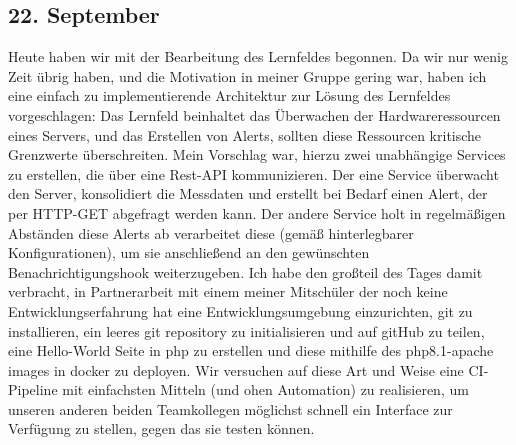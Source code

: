 \subsection{22. September}
Heute haben wir mit der Bearbeitung des Lernfeldes begonnen. Da wir nur wenig Zeit übrig haben, und die Motivation in meiner Gruppe gering war, haben ich eine einfach zu implementierende Architektur zur Lösung des Lernfeldes vorgeschlagen: Das Lernfeld beinhaltet das Überwachen der Hardwareressourcen eines Servers, und das Erstellen von Alerts, sollten diese Ressourcen kritische Grenzwerte überschreiten. Mein Vorschlag war, hierzu zwei unabhängige Services zu erstellen, die über eine Rest-API kommunizieren. Der eine Service überwacht den Server, konsolidiert die Messdaten und erstellt bei Bedarf einen Alert, der per HTTP-GET abgefragt werden kann. Der andere Service holt in regelmäßigen Abständen diese Alerts ab verarbeitet diese (gemäß hinterlegbarer Konfigurationen), um sie anschließend an den gewünschten Benachrichtigungshook weiterzugeben.
Ich habe den großteil des Tages damit verbracht, in Partnerarbeit mit einem meiner Mitschüler der noch keine Entwicklungserfahrung hat eine Entwicklungsumgebung einzurichten, git zu installieren, ein leeres git repository zu initialisieren und auf gitHub zu teilen, eine Hello-World Seite in php zu erstellen und diese mithilfe des php8.1-apache images in docker zu deployen. Wir versuchen auf diese Art und Weise eine CI-Pipeline mit einfachsten Mitteln (und ohen Automation) zu realisieren, um unseren anderen beiden Teamkollegen möglichst schnell ein Interface zur Verfügung zu stellen, gegen das sie testen können.